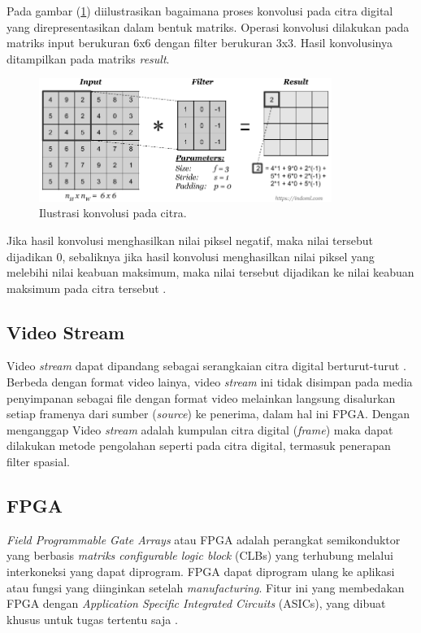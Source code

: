 Pada gambar (\ref{fig:conv3}) diilustrasikan bagaimana proses konvolusi pada citra digital yang direpresentasikan dalam bentuk matriks. Operasi konvolusi dilakukan pada matriks input berukuran 6x6 dengan filter berukuran 3x3. Hasil konvolusinya ditampilkan pada matriks \textit{result}.
\begin{figure}[ht]
    \includegraphics[width=0.85\textwidth, center]{images/convolution-operation.png}
    \caption{Ilustrasi konvolusi pada citra.}
    \label{fig:conv3}
\end{figure}

Jika hasil konvolusi menghasilkan nilai piksel negatif, maka nilai tersebut dijadikan 0, sebaliknya jika hasil konvolusi menghasilkan nilai piksel yang melebihi nilai keabuan maksimum, maka nilai tersebut dijadikan ke nilai keabuan maksimum pada citra tersebut \cite{book:sutoyo}.

\subsection{Video Stream}
Video \textit{stream} dapat dipandang sebagai serangkaian citra digital berturut-turut \cite{thesis:jin}. Berbeda dengan format video lainya, video \textit{stream} ini tidak disimpan pada media penyimpanan sebagai file dengan format video melainkan langsung disalurkan setiap framenya dari sumber (\textit{source}) ke penerima, dalam hal ini FPGA.  Dengan menganggap Video \textit{stream} adalah kumpulan citra digital (\textit{frame}) maka dapat dilakukan metode pengolahan seperti pada citra digital, termasuk penerapan filter spasial. 

\subsection{FPGA}
\textit{Field Programmable Gate Arrays} atau FPGA adalah perangkat semikonduktor yang berbasis \textit{matriks configurable logic block} (CLBs) yang terhubung melalui interkoneksi yang dapat diprogram. FPGA dapat diprogram ulang ke aplikasi atau fungsi yang diinginkan setelah \textit{manufacturing}. Fitur ini yang membedakan FPGA dengan \textit{Application Specific Integrated Circuits} (ASICs), yang dibuat khusus untuk tugas tertentu saja \cite{XILINX}.

